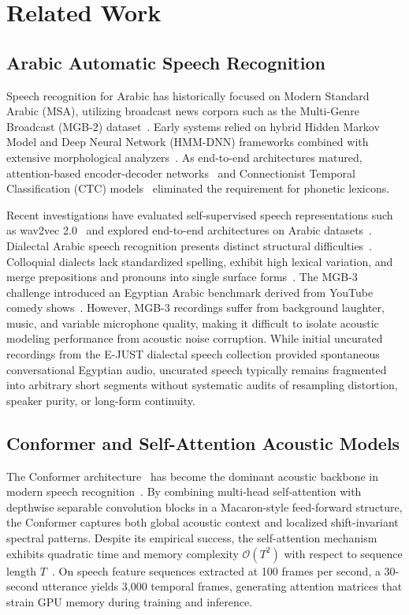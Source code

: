 \documentclass[journal]{IEEEtran}
\begin{document}
\section{Related Work}
\label{sec:related_work}

\subsection{Arabic Automatic Speech Recognition}
Speech recognition for Arabic has historically focused on Modern Standard Arabic (MSA), utilizing broadcast news corpora such as the Multi-Genre Broadcast (MGB-2) dataset~\cite{ali2016mgb2}. Early systems relied on hybrid Hidden Markov Model and Deep Neural Network (HMM-DNN) frameworks combined with extensive morphological analyzers~\cite{kirchhoff2006novel,habash2010introduction}. As end-to-end architectures matured, attention-based encoder-decoder networks~\cite{chan2016las,chiu2018sota} and Connectionist Temporal Classification (CTC) models~\cite{graves2006ctc,watanabe2018espnet} eliminated the requirement for phonetic lexicons.

Recent investigations have evaluated self-supervised speech representations such as wav2vec 2.0~\cite{baevski2020wav2vec} and explored end-to-end architectures on Arabic datasets~\cite{deshmukh2021exploration}. Dialectal Arabic speech recognition presents distinct structural difficulties~\cite{billa2019cross,zaidan2014arabic}. Colloquial dialects lack standardized spelling, exhibit high lexical variation, and merge prepositions and pronouns into single surface forms~\cite{alhaj2018acoustic,elfeky2018towards}. The MGB-3 challenge introduced an Egyptian Arabic benchmark derived from YouTube comedy shows~\cite{ali2017mgb3}. However, MGB-3 recordings suffer from background laughter, music, and variable microphone quality, making it difficult to isolate acoustic modeling performance from acoustic noise corruption. While initial uncurated recordings from the E-JUST dialectal speech collection provided spontaneous conversational Egyptian audio, uncurated speech typically remains fragmented into arbitrary short segments without systematic audits of resampling distortion, speaker purity, or long-form continuity.

\subsection{Conformer and Self-Attention Acoustic Models}
The Conformer architecture~\cite{gulati2020conformer} has become the dominant acoustic backbone in modern speech recognition~\cite{prabhavalkar2024survey}. By combining multi-head self-attention with depthwise separable convolution blocks in a Macaron-style feed-forward structure, the Conformer captures both global acoustic context and localized shift-invariant spectral patterns. Despite its empirical success, the self-attention mechanism exhibits quadratic time and memory complexity $\mathcal{O}(T^2)$ with respect to sequence length $T$~\cite{vaswani2017attention}. On speech feature sequences extracted at 100 frames per second, a 30-second utterance yields 3,000 temporal frames, generating attention matrices that strain GPU memory during training and inference.
\end{document}
